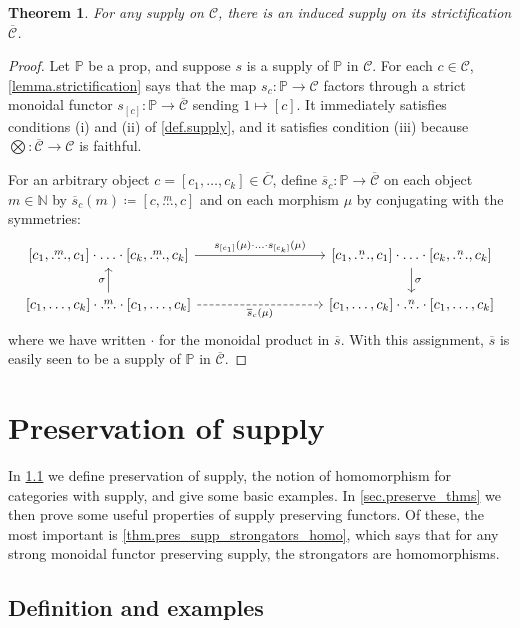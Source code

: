 \documentclass[11pt, oneside, article]{memoir}
\theoremstyle{plain}
\newtheorem{theorem}{Theorem}[chapter]
\theoremstyle{definition}
\theoremstyle{remark}
\newcommand{\cat}[1]{\mathcal{#1}}%
\newcommand{\strict}[1]{\overline{#1}}
\newcommand{\nn}{\mathbb{N}}
\newcommand{\pp}{\mathbb{P}}
\newcommand{\Ldots}[1]{\overset{#1}{\ldots}}
\begin{document}
\begin{theorem}\label{thm.supply_strictification}
For any supply on $\cat{C}$, there is an induced supply on its strictification $\strict{\cat{C}}$.
\end{theorem}
\begin{proof}
Let $\pp$ be a prop, and suppose $s$ is a supply of $\pp$ in $\cat{C}$. For each $c\in\cat{C}$, \cref{lemma.strictification} says that the map $s_c\colon\pp\to\cat{C}$ factors through a strict monoidal functor $s_{[c]}\colon\pp\to\strict{\cat{C}}$ sending $1\mapsto[c]$. It immediately satisfies conditions (i) and (ii) of \cref{def.supply}, and it satisfies condition (iii) because $\bigotimes\colon\strict{\cat{C}}\to\cat{C}$ is faithful.

For an arbitrary object $c=[c_1,\ldots,c_k]\in\strict{C}$, define $\strict{s}_c\colon\pp\to\strict{\cat{C}}$ on each object $m\in\nn$ by $\strict{s}_c(m)\coloneqq[c,\Ldots{m},c]$ and on each morphism $\mu$ by conjugating with the symmetries:
\[
\begin{tikzcd}[column sep=90pt]
	{[c_1,\Ldots{m},c_1] \cdot \ldots \cdot [c_k,\Ldots{m}, c_k]}
		\ar[r, "{s_{[c_1]}(\mu) \cdot \ldots \cdot s_{[c_k]}(\mu)}"]&
	{[c_1,\Ldots{n},c_1] \cdot \ldots\cdot [c_k,\Ldots{n}, c_k]}
		\ar[d, "\sigma"]\\
	{[c_1,\ldots, c_k] \cdot \Ldots{m} \cdot [c_1,\ldots,c_k]}
		\ar[u, "\sigma"]\ar[r, dashed, "\strict{s}_c(\mu)"']&
	{[c_1,\ldots, c_k] \cdot \Ldots{n} \cdot [c_1,\ldots,c_k]}
\end{tikzcd}
\]
where we have written $\cdot$ for the monoidal product in $\strict{s}$.
With this assignment, $\strict{s}$ is easily seen to be a supply of $\pp$ in $\strict{\cat{C}}$.
\end{proof}

\chapter{Preservation of supply}

In \cref{sec.pres_supply} we define preservation of supply, the notion of homomorphism for categories with supply, and give some basic examples. In \cref{sec.preserve_thms} we then prove some useful properties of supply preserving functors. Of these, the most important is \cref{thm.pres_supp_strongators_homo}, which says that for any strong monoidal functor preserving supply, the strongators are homomorphisms.


\section{Definition and examples}\label{sec.pres_supply}
\end{document}
